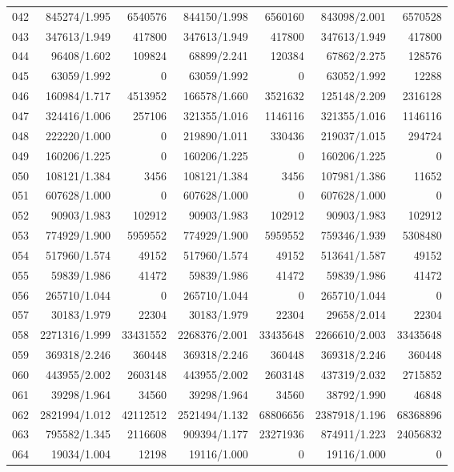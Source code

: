 \begin{longtable}{crrrrrr}
042 & 845274/1.995 & 6540576 & 844150/1.998 & 6560160 & 843098/2.001 & 6570528 \\
043 & 347613/1.949 & 417800 & 347613/1.949 & 417800 & 347613/1.949 & 417800 \\
044 & 96408/1.602 & 109824 & 68899/2.241 & 120384 & 67862/2.275 & 128576 \\
045 & 63059/1.992 & 0 & 63059/1.992 & 0 & 63052/1.992 & 12288 \\
046 & 160984/1.717 & 4513952 & 166578/1.660 & 3521632 & 125148/2.209 & 2316128 \\
047 & 324416/1.006 & 257106 & 321355/1.016 & 1146116 & 321355/1.016 & 1146116 \\
048 & 222220/1.000 & 0 & 219890/1.011 & 330436 & 219037/1.015 & 294724 \\
049 & 160206/1.225 & 0 & 160206/1.225 & 0 & 160206/1.225 & 0 \\
050 & 108121/1.384 & 3456 & 108121/1.384 & 3456 & 107981/1.386 & 11652 \\
051 & 607628/1.000 & 0 & 607628/1.000 & 0 & 607628/1.000 & 0 \\
052 & 90903/1.983 & 102912 & 90903/1.983 & 102912 & 90903/1.983 & 102912 \\
053 & 774929/1.900 & 5959552 & 774929/1.900 & 5959552 & 759346/1.939 & 5308480 \\
054 & 517960/1.574 & 49152 & 517960/1.574 & 49152 & 513641/1.587 & 49152 \\
055 & 59839/1.986 & 41472 & 59839/1.986 & 41472 & 59839/1.986 & 41472 \\
056 & 265710/1.044 & 0 & 265710/1.044 & 0 & 265710/1.044 & 0 \\
057 & 30183/1.979 & 22304 & 30183/1.979 & 22304 & 29658/2.014 & 22304 \\
058 & 2271316/1.999 & 33431552 & 2268376/2.001 & 33435648 & 2266610/2.003 & 33435648 \\
059 & 369318/2.246 & 360448 & 369318/2.246 & 360448 & 369318/2.246 & 360448 \\
060 & 443955/2.002 & 2603148 & 443955/2.002 & 2603148 & 437319/2.032 & 2715852 \\
061 & 39298/1.964 & 34560 & 39298/1.964 & 34560 & 38792/1.990 & 46848 \\
062 & 2821994/1.012 & 42112512 & 2521494/1.132 & 68806656 & 2387918/1.196 & 68368896 \\
063 & 795582/1.345 & 2116608 & 909394/1.177 & 23271936 & 874911/1.223 & 24056832 \\
064 & 19034/1.004 & 12198 & 19116/1.000 & 0 & 19116/1.000 & 0 \\

\end{longtable}
